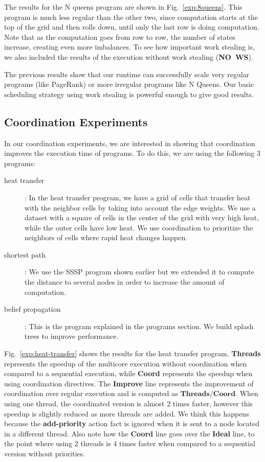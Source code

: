 The results for the N queens program are shown in Fig.~\ref{exp:8queens}. This program is much less regular than the other two, since computation starts at the top of the grid and then rolls down, until only the last row is doing computation. Note that as the computation goes from row to row, the number of states increase, creating even more imbalances. To see how important work stealing is, we also included the results of the execution without work stealing (\textbf{NO~WS}).

The previous results show that our runtime can successfully scale very regular programs (like PageRank) or more irregular programs like N Queens. Our basic
scheduling strategy using work stealing is powerful enough to give good results.

\subsection{Coordination Experiments}

In our coordination experiments, we are interested in showing that coordination improves the execution time of programs.
To do this, we are using the following 3 programs:

\begin{description}
   \item[heat transfer]: In the heat transfer program, we have a grid of cells that transfer heat with the neighbor cells by taking into account the edge weights. We use a dataset with a square of cells in the center of the grid with very high heat, while the outer cells have low heat. We use coordination to prioritize the neighbors of cells where rapid heat changes happen.
   \item[shortest path]: We use the SSSP program shown earlier but we extended it to compute the distance to several nodes in order to increase the amount of computation.
   \item[belief propagation]: This is the program explained in the programs section. We build splash trees to improve performance.
\end{description}

Fig.~\ref{exp:heat-transfer} shows the results for the heat transfer program. \textbf{Threads} represents the speedup of the multicore execution
without coordination when compared to a sequential execution, while \textbf{Coord} represents the speedup when using coordination directives. The
\textbf{Improve} line represents the improvement of coordination over regular execution and is computed as $\mathbf{Threads} / \mathbf{Coord}$.
When using one thread, the coordinated version is almost 2 times
faster, however this speedup is slightly reduced as more threads are added. We think this happens because the \textbf{add-priority} action fact is ignored
when it is sent to a node located in a different thread.
Also note how the \textbf{Coord} line goes over the \textbf{Ideal} line, to the point where using 2 threads is 4 times faster when compared to a sequential
version without priorities.

